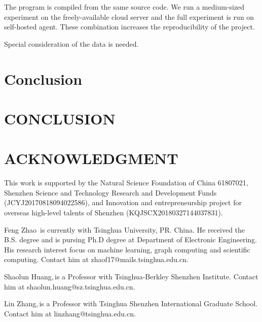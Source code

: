 \documentclass{IEEEcsmag}
\begin{document}
The program is compiled from the same source code. We run a medium-sized experiment on the freely-available cloud server and the full experiment is run on self-hosted agent. These combination increases the reproducibility of the project.

Special consideration of the data is needed.



\section{Conclusion}


\section{CONCLUSION}


\section{ACKNOWLEDGMENT}

This work is supported by the Natural Science Foundation of China 61807021, Shenzhen Science and Technology Research and Development Funds (JCYJ20170818094022586), and Innovation and entrepreneurship project for overseas high-level talents of Shenzhen (KQJSCX20180327144037831).







\begin{IEEEbiography}{Feng Zhao}{\,} is
currently with Tsinghua University, PR. China. He received the B.S. degree and is pursing Ph.D degree at Department of Electronic Engineering. His research interest focus on machine learning, graph computing and scientific computing. Contact him at zhaof17@mails.tsinghua.edu.cn.
\end{IEEEbiography}

\begin{IEEEbiography}{Shaolun Huang,}{\,}is a Professor with Tsinghua-Berkley Shenzhen Institute. Contact him at shaolun.huang@sz.tsinghua.edu.cn.
\end{IEEEbiography}

\begin{IEEEbiography}{Lin Zhang,}{\,}is a Professor with Tsinghua Shenzhen International Graduate School. Contact him at linzhang@tsinghua.edu.cn.
\end{IEEEbiography}
\end{document}
